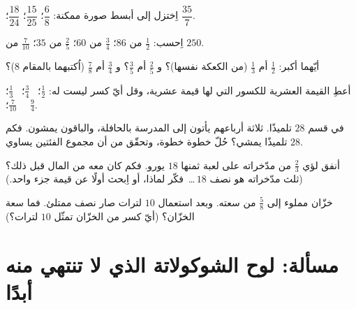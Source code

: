 \begin{exercise}[$\star$]\label{exo:g6:fractions:6}
اِختزل إلى أبسط صورة ممكنة: $\dfrac{6}{8}$؛ \quad $\dfrac{15}{25}$؛
\quad $\dfrac{18}{24}$؛ \quad $\dfrac{35}{7}$.
\end{exercise}

\begin{exercise}[$\star$]\label{exo:g6:fractions:7}
اِحسب: $\frac12$ من $86$؛ \quad $\frac34$ من $60$؛ \quad $\frac25$ من
$35$؛ \quad $\frac{7}{10}$ من $250$.
\end{exercise}

\begin{exercise}[$\star$]\label{exo:g6:fractions:8}
أيّهما أكبر: $\frac12$ أم $\frac13$ (من الكعكة نفسها)؟ و $\frac25$
أم $\frac35$؟ و $\frac34$ أم $\frac78$ (اُكتبهما بالمقام
$8$)؟
\end{exercise}

\begin{exercise}[$\star\star$]\label{exo:g6:fractions:9}
أعطِ القيمة العشرية للكسور التي لها قيمة عشرية، وقل أيّ
كسر ليست له: $\frac12$؛ \ $\frac34$؛ \ $\frac13$؛ \ $\frac{7}{10}$؛
\ $\frac{9}{4}$.
\end{exercise}

\begin{exercise}[$\star\star$]\label{exo:g6:fractions:10}
في قسم $28$ تلميذًا. ثلاثة أرباعهم يأتون إلى المدرسة
بالحافلة، والباقون يمشون. فكم تلميذًا يمشي؟ حُلّ خطوة خطوة، وتحقّق
من أن مجموع الفئتين يساوي $28$.
\end{exercise}

\begin{exercise}[$\star\star$]\label{exo:g6:fractions:11}
أنفق لؤي $\frac23$ من مدّخراته على لعبة ثمنها $18$ يورو. فكم
كان معه من المال قبل ذلك؟ (ثلث مدّخراته هو نصف
$18$\,\dots\ فكّر لماذا، أو اِبحث أولًا عن قيمة جزء واحد.)
\end{exercise}

\begin{exercise}[$\star\star\star$]\label{exo:g6:fractions:12}
خزّان مملوء إلى $\frac58$ من سعته. وبعد استعمال $10$ لترات
صار نصف ممتلئ. فما سعة الخزّان؟ (أيّ كسر من
الخزّان تمثّل $10$ لترات؟)
\end{exercise}

\section{مسألة: لوح الشوكولاتة الذي لا تنتهي منه أبدًا}

